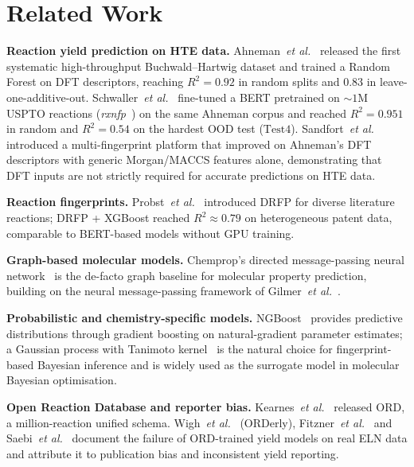 \documentclass[conference]{IEEEtran}
\begin{document}
\section{Related Work}
\label{sec:related}

\noindent\textbf{Reaction yield prediction on HTE data.}
Ahneman~\textit{et al.}~\cite{Ahneman2018} released the first systematic
high-throughput Buchwald--Hartwig dataset and trained a Random Forest on
DFT descriptors, reaching $R^{2}=0.92$ in random splits and $0.83$ in
leave-one-additive-out. Schwaller~\textit{et al.}~\cite{Schwaller2021YB}
fine-tuned a BERT pretrained on $\sim$$1$M USPTO reactions
(\emph{rxnfp}~\cite{Schwaller2021Map}) on the same Ahneman corpus and
reached $R^{2}=0.951$ in random and $R^{2}=0.54$ on the hardest OOD test
($\mathrm{Test4}$).
Sandfort~\textit{et al.}~\cite{Sandfort2020} introduced a
multi-fingerprint platform that improved on Ahneman's DFT descriptors with
generic Morgan/MACCS features alone, demonstrating that DFT inputs are not
strictly required for accurate predictions on HTE data.

\noindent\textbf{Reaction fingerprints.}
Probst~\textit{et al.}~\cite{Probst2022} introduced DRFP for diverse
literature reactions; DRFP + XGBoost reached $R^{2}\approx 0.79$ on
heterogeneous patent data, comparable to BERT-based models without GPU
training.

\noindent\textbf{Graph-based molecular models.}
Chemprop's directed message-passing neural network~\cite{Yang2019} is the
de-facto graph baseline for molecular property prediction, building on the
neural message-passing framework of Gilmer~\textit{et
al.}~\cite{Gilmer2017}.

\noindent\textbf{Probabilistic and chemistry-specific models.}
NGBoost~\cite{Duan2020} provides predictive distributions through gradient
boosting on natural-gradient parameter estimates; a Gaussian process with
Tanimoto kernel~\cite{Griffiths2020} is the natural choice for
fingerprint-based Bayesian inference and is widely used as the surrogate
model in molecular Bayesian optimisation.

\noindent\textbf{Open Reaction Database and reporter bias.}
Kearnes~\textit{et al.}~\cite{Kearnes2021} released ORD, a million-reaction
unified schema. Wigh~\textit{et al.}~\cite{Wigh2024} (ORDerly),
Fitzner~\textit{et al.}~\cite{Fitzner2023} and Saebi~\textit{et
al.}~\cite{Saebi2023} document the failure of ORD-trained yield models on
real ELN data and attribute it to publication bias and inconsistent yield
reporting.
\end{document}

